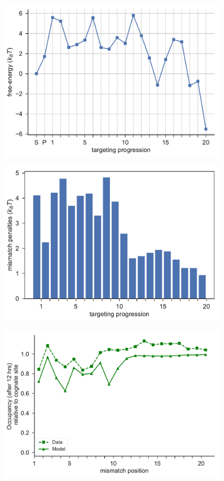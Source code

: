 \documentclass[a4paper,twoside]{revtex4-1}
\begin{document}
\begin{figure}[H]
\includegraphics[scale=0.5]{fig23_10_10_2018.pdf}
\end{figure}

\begin{figure}[H]
\includegraphics[scale=0.5]{fig24_10_10_2018.pdf}
\end{figure}

\begin{figure}[H]
\includegraphics[scale=0.5]{fig25_10_10_2018.pdf}
\end{figure}
\end{document}
